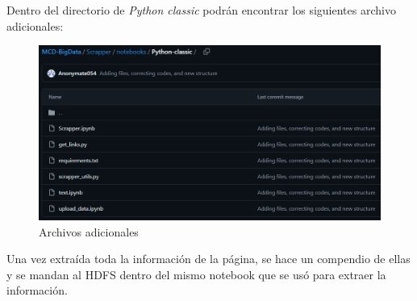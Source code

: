 \documentclass{article}
\begin{document}
Dentro del directorio de \textit{Python classic} podrán encontrar los siguientes archivo adicionales:

\begin{figure}[h]
\centering
\includegraphics[width=0.7\linewidth]{Reports/images/files.png}
\caption{\label{fig:files}Archivos adicionales}
\end{figure}

\newpage
Una vez extraída toda la información de la página, se hace un compendio de ellas y se mandan al HDFS dentro del mismo notebook que se usó para extraer la información. 
\end{document}
